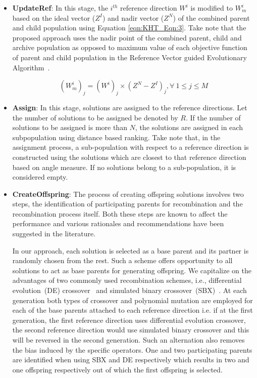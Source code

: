 \documentclass{sig-alternate}
\begin{document}
\begin{itemize}
	\item \textbf{UpdateRef}: In this stage, the $i^{th}$ reference direction $W^i$ is modified to $W^i_m$ based on the ideal vector ($Z^I$) and nadir vector ($Z^N$) of the combined parent and child population using Equation \ref{eqn:KHT_Eqn:3}. Take note that the proposed approach uses the nadir point of the combined parent, child and archive population as opposed to maximum value of each objective function of parent and child population in the Reference Vector guided Evolutionary Algorithm~\cite{Cheng2016many}. 
	
	\begin{equation}
	(W^i_m)_j = (W^i)_j\times(Z^N - Z^I)_j, \forall~1\le j\le M
	\label{eqn:KHT_Eqn:3}
	\end{equation}
	
	
	\item \textbf{Assign}: In this stage, solutions are assigned to the reference directions. Let the number of solutions to be assigned be denoted by $R$. If the number of solutions to be assigned is more than $N$, the solutions are assigned in each subpopulation using distance based ranking. Take note that, in the assignment process, a sub-population with respect to a reference direction is constructed using the solutions which are closest to that reference direction based on angle measure. If no solutions belong to a sub-population, it is considered empty. 
	
	
	\item \textbf{CreateOffspring}: The process of creating offspring solutions involves two steps, the identification of participating parents for recombination and the recombination process itself. Both these steps are known to affect the performance and various rationales and recommendations have been suggested in the literature. 
	
	In our approach, each solution is selected as a base parent and its partner is randomly chosen from the rest. Such a scheme offers opportunity to all solutions to act as base parents for generating offspring. We capitalize on the advantages of two commonly used recombination schemes, i.e., differential evolution~(DE) crossover~\cite{das2011de} and simulated binary crossover~(SBX)~\cite{deb2002fast}. At each generation both types of crossover and polynomial mutation are employed for each of the base parents attached to each reference direction i.e. if at the first generation, the first reference direction uses differential evolution crossover, the second reference direction  would use simulated binary crossover and this will be reversed in the second generation. Such an alternation also removes the bias induced by the specific operators. One and two participating parents are identified when using SBX and DE respectively which results in two and one offspring respectively out of which the first offspring is selected.       
	
\end{itemize}
\end{document}

